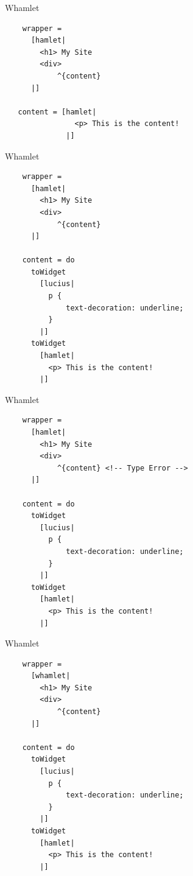 \documentclass[pdf]{beamer}
\begin{document}
\begin{frame}[fragile]{Whamlet}
  \begin{verbatim}
    wrapper =
      [hamlet|
        <h1> My Site
        <div>
            ^{content}
      |]

   content = [hamlet|
                <p> This is the content!
              |]
  \end{verbatim}
\end{frame}

\begin{frame}[fragile]{Whamlet}
  \begin{verbatim}
    wrapper =
      [hamlet|
        <h1> My Site
        <div>
            ^{content}
      |]

    content = do
      toWidget
        [lucius|
          p {
              text-decoration: underline;
          }
        |]
      toWidget
        [hamlet|
          <p> This is the content!
        |]
  \end{verbatim}
\end{frame}

\begin{frame}[fragile]{Whamlet}
  \begin{verbatim}
    wrapper =
      [hamlet|
        <h1> My Site
        <div>
            ^{content} <!-- Type Error -->
      |]

    content = do
      toWidget
        [lucius|
          p {
              text-decoration: underline;
          }
        |]
      toWidget
        [hamlet|
          <p> This is the content!
        |]
  \end{verbatim}
\end{frame}

\begin{frame}[fragile]{Whamlet}
  \begin{verbatim}
    wrapper =
      [whamlet|
        <h1> My Site
        <div>
            ^{content}
      |]

    content = do
      toWidget
        [lucius|
          p {
              text-decoration: underline;
          }
        |]
      toWidget
        [hamlet|
          <p> This is the content!
        |]
  \end{verbatim}
\end{frame}
\end{document}
